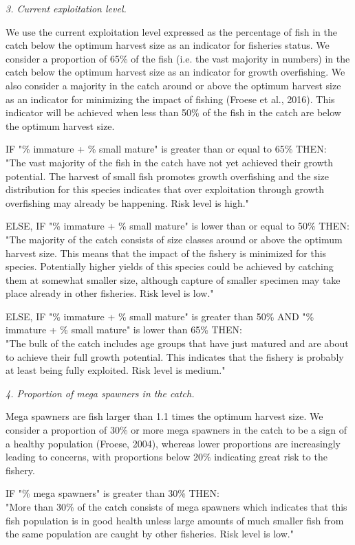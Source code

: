 \textit{3. Current exploitation level.}

We use the current exploitation level expressed as the percentage of fish in the catch below the optimum harvest size as an indicator for fisheries status. We consider a proportion of 65\% of the fish (i.e. the vast majority in numbers) in the catch below the optimum harvest size as an indicator for growth overfishing. We also consider a majority in the catch around or above the optimum harvest size as an indicator for minimizing the impact of fishing (Froese et al., 2016). This indicator will be achieved when less than 50\% of the fish in the catch are below the optimum harvest size.

IF "\% immature + \% small mature" is greater than or equal to 65\% THEN:\\[0cm]
"The vast majority of the fish in the catch have not yet achieved their growth potential. The harvest of small fish promotes growth overfishing and the size distribution for this species indicates that over exploitation through growth overfishing may already be happening. Risk level is high."

ELSE, IF "\% immature + \% small mature" is lower than or equal to 50\% THEN:\\[0cm]
"The majority of the catch consists of size classes around or above the optimum harvest size. This means that the impact of the fishery is minimized for this species. Potentially higher yields of this species could be achieved by catching them at somewhat smaller size, although capture of smaller specimen may take place already in other fisheries. Risk level is low."

ELSE, IF "\% immature + \% small mature" is greater than 50\% AND "\% immature + \% small mature" is lower than 65\% THEN:\\[0cm]
"The bulk of the catch includes age groups that have just matured and are about to achieve their full growth potential. This indicates that the fishery is probably at least being fully exploited. Risk level is medium."

\textit{4. Proportion of mega spawners in the catch.}

Mega spawners are fish larger than 1.1 times the optimum harvest size. We consider a proportion of 30\% or more mega spawners in the catch to be a sign of a healthy population (Froese, 2004), whereas lower proportions are increasingly leading to concerns, with proportions below 20\% indicating great risk to the fishery.

IF "\% mega spawners" is greater than 30\% THEN:\\[0cm]
"More than 30\% of the catch consists of mega spawners which indicates that this fish population is in good health unless large amounts of much smaller fish from the same population are caught by other fisheries. Risk level is low."

